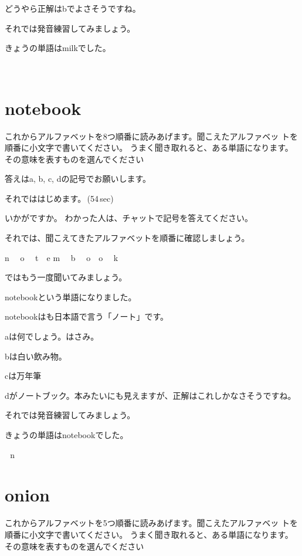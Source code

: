 \documentclass[12pt]{jlreq}
\begin{document}
どうやら正解はbでよさそうですね。

それでは発音練習してみましょう。

きょうの単語はmilkでした。

{\large \ComputerMouse}\,\,
\newpage
\section{notebook}

これからアルファベットを8つ順番に読みあげます。聞こえたアルファベッ
トを順番に小文字で書いてください。
うまく聞き取れると、ある単語になります。
その意味を表すものを選んでください

答えはa, b, c, dの記号でお願いします。

それでははじめます。\faVolumeUp\,(54\,sec)

いかがですか。
わかった人は、チャットで記号を答えてください。

それでは、聞こえてきたアルファベットを順番に確認しましょう。{\large \ComputerMouse}

n\,\,
{\large \ComputerMouse}\,\,
o\,\,
{\large \ComputerMouse}\,\,
t
{\large \ComputerMouse}\,\,
e\,\,m\,\,
{\large \ComputerMouse}\,\,
b\,\,
{\large \ComputerMouse}\,\,
o
{\large \ComputerMouse}\,\,
o\,\,
{\large \ComputerMouse}\,\,
k\,\,

ではもう一度聞いてみましょう。

notebookという単語になりました。

notebookはも日本語で言う「ノート」です。

aは何でしょう。はさみ。

bは白い飲み物。

cは万年筆

dがノートブック。本みたいにも見えますが、正解はこれしかなさそうですね。


それでは発音練習してみましょう。

きょうの単語はnotebookでした。

{\large \ComputerMouse}\,\,
n
\newpage
\section{onion}

これからアルファベットを5つ順番に読みあげます。聞こえたアルファベッ
トを順番に小文字で書いてください。
うまく聞き取れると、ある単語になります。
その意味を表すものを選んでください
\end{document}
